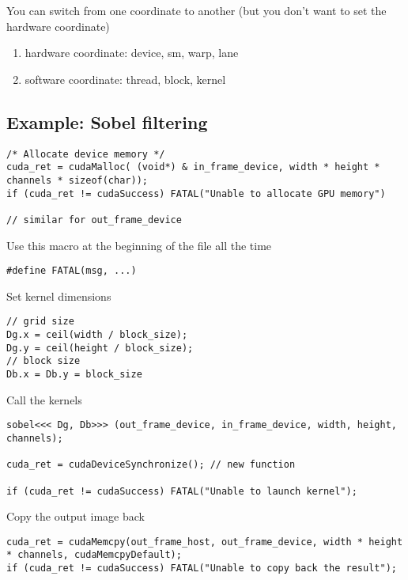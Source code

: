 You can switch from one coordinate to another (but you don't want to
set the hardware coordinate)
\begin{enumerate}
\item hardware coordinate: device, sm, warp, lane
\item software coordinate: thread, block, kernel
\end{enumerate}


\subsection{Example: Sobel filtering }
\label{sec:exampl-sobel-filt}


\begin{verbatim}
/* Allocate device memory */
cuda_ret = cudaMalloc( (void*) & in_frame_device, width * height *
channels * sizeof(char));
if (cuda_ret != cudaSuccess) FATAL("Unable to allocate GPU memory")

// similar for out_frame_device

\end{verbatim}

\begin{framed}
  Use this macro at the beginning of the file all the time
\begin{lstlisting}
#define FATAL(msg, ...) 

\end{lstlisting}
\end{framed}

Set kernel dimensions
\begin{lstlisting}
// grid size
Dg.x = ceil(width / block_size);
Dg.y = ceil(height / block_size);
// block size
Db.x = Db.y = block_size
\end{lstlisting}

Call the kernels
\begin{lstlisting}
sobel<<< Dg, Db>>> (out_frame_device, in_frame_device, width, height,
channels);

cuda_ret = cudaDeviceSynchronize(); // new function

if (cuda_ret != cudaSuccess) FATAL("Unable to launch kernel");
\end{lstlisting}

Copy the output image back
\begin{lstlisting}
cuda_ret = cudaMemcpy(out_frame_host, out_frame_device, width * height
* channels, cudaMemcpyDefault); 
if (cuda_ret != cudaSuccess) FATAL("Unable to copy back the result");
\end{lstlisting}

